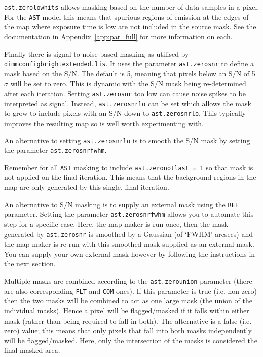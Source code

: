 \documentclass[twoside,11pt]{article}
\newcommand{\htmlref}[2]{#1}
\newcommand{\latexhtml}[2]{#1}
\renewcommand{\_}{\texttt{\symbol{95}}}
\newcommand{\cref}[3]{\latexhtml{#1~\ref{#2}}{\htmlref{#3}{#2}}}
\begin{document}
\texttt{ast.zero\_lowhits} allows masking based on the number of data
samples in a pixel. For the \texttt{AST} model this means that
spurious regions of emission at the edges of the map where exposure
time is low are not included in the source mask. See the documentation
in \cref{Appendix}{app:par_full}{Configuration Parameters:
dimmconfig.lis} for more information on each.

Finally there is signal-to-noise based masking as utilised by
\texttt{dimmconfig\_bright\_extended.lis}. It uses the parameter
\texttt{ast.zero\_snr} to define a mask based on the S/N. The default
is 5, meaning that pixels below an S/N of 5\,$\sigma$ will be set to
zero. This is dynamic with the S/N mask being re-determined after each
iteration. Setting \texttt{ast.zero\_snr} too low can cause noise
spikes to be interpreted as signal. Instead, \texttt{ast.zero\_snrlo}
can be set which allows the mask to grow to include pixels with an S/N
down to \texttt{ast.zero\_snrlo}. This typically improves the
resulting map so is well worth experimenting with.

An alternative to setting \texttt{ast.zero\_snrlo} is to smooth the
S/N mask by setting the parameter \texttt{ast.zero\_snr\_fwhm}.

Remember for all \texttt{AST} masking to include
\texttt{ast.zero\_notlast = 1} so that mask is not applied on the
final iteration. This means that the background regions in the map are
only generated by this single, final iteration.

An alternative to S/N masking is to supply an external mask using the
\texttt{REF} parameter. Setting the parameter
\texttt{ast.zero\_snr\_fwhm} allows you to automate this step for a
specific case. Here, the map-maker is run once, then the mask
generated by \texttt{ast.zero\_snr} is smoothed by a Gaussian (of
`FWHM' arcsecs) and the map-maker is re-run with this smoothed mask
supplied as an external mask. You can supply your own external mask
however by following the instructions in the next section.

Multiple masks are combined according to the \texttt{ast.zero\_union}
parameter (there are also corresponding \texttt{FLT} and \texttt{COM}
ones). If this parameter is true (i.e. non-zero) then the two masks
will be combined to act as one large mask (the union of the individual
masks). Hence a pixel will be flagged/masked if it falls within either
mask (rather than being required to fall in both). The alternative is
a false (i.e. zero) value; this means that only pixels that fall into
both masks independently will be flagged/masked. Here, only the
intersection of the masks is considered the final masked area.
\end{document}

